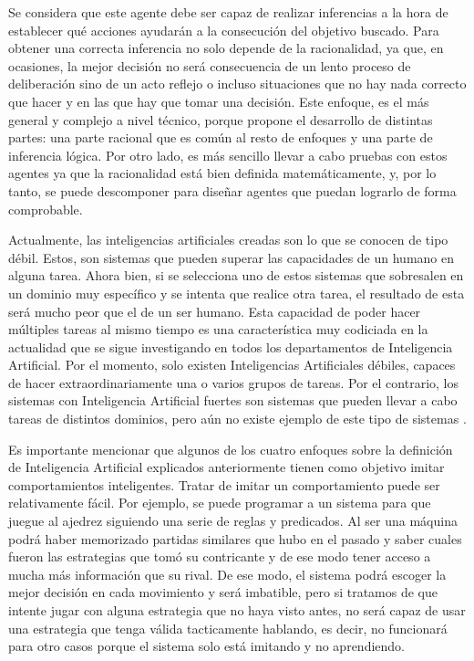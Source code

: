 \begin{enumerate}
Se considera que este agente debe ser capaz de realizar inferencias a la hora de establecer qué acciones ayudarán a la consecución del objetivo buscado. Para obtener una correcta inferencia no solo depende de la racionalidad, ya que, en ocasiones, la mejor decisión no será consecuencia de un lento proceso de deliberación sino de un acto reflejo o incluso situaciones que no hay nada correcto que hacer y en las que hay que tomar una decisión. Este enfoque, es el más general y complejo a nivel técnico, porque propone el desarrollo de distintas partes: una parte racional que es común al resto de enfoques y una parte de inferencia lógica. Por otro lado, es más sencillo llevar a cabo pruebas con estos agentes ya que la racionalidad está bien definida matemáticamente, y, por lo tanto, se puede descomponer para diseñar agentes que puedan lograrlo de forma comprobable.  \cite{amodernapproach}
\end{enumerate}


Actualmente, las inteligencias artificiales creadas son lo que se conocen de tipo débil. Estos, son sistemas que pueden superar las capacidades de un humano en alguna tarea. Ahora bien, si se selecciona uno de estos sistemas que sobresalen en un dominio muy específico y se intenta que realice otra tarea, el resultado de esta será mucho peor que el de un ser humano. Esta capacidad de poder hacer múltiples tareas al mismo tiempo es una característica muy codiciada en la actualidad que se sigue investigando en todos los departamentos de Inteligencia Artificial. Por el momento, solo existen Inteligencias Artificiales débiles, capaces de hacer extraordinariamente una o varios grupos de tareas. Por el contrario, los sistemas con Inteligencia Artificial fuertes son sistemas que pueden llevar a cabo tareas de distintos dominios, pero aún no existe ejemplo de este tipo de sistemas \cite{amodernapproach}.
\newline

Es importante mencionar que algunos de los cuatro enfoques sobre la definición de Inteligencia Artificial explicados anteriormente tienen como objetivo imitar comportamientos inteligentes. Tratar de imitar un comportamiento puede ser relativamente fácil. Por ejemplo, se puede programar a un sistema para que juegue al ajedrez siguiendo una serie de reglas y predicados. Al ser una máquina podrá haber memorizado partidas similares que hubo en el pasado y saber cuales fueron las estrategias que tomó su contricante y de ese modo tener acceso a mucha más información que su rival. De ese modo, el sistema podrá escoger la mejor decisión en cada movimiento y será imbatible, pero si tratamos de que intente jugar con alguna estrategia que no haya visto antes, no será capaz de usar una estrategia que tenga válida tacticamente hablando, es decir, no funcionará para otro casos porque el sistema solo está imitando y no aprendiendo.
\newline

